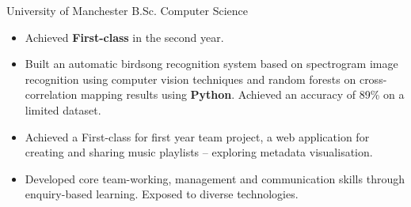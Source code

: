 \documentclass[12pt,a4paper]{article}
\begin{document}
\noindent{}



       {University of Manchester}
       {B.Sc. Computer Science}
{%
  \begin{itemize}
    \item Achieved {\bfseries First-class} in the second year.

    \item Built an automatic birdsong recognition system based on spectrogram
      image recognition using computer vision techniques and random forests on
      cross-correlation mapping results using
      {\bfseries Python}.
      Achieved an accuracy of 89\% on a limited dataset.

    \item Achieved a First-class for first year team project, a web application
      for creating and sharing music playlists -- exploring metadata visualisation.

    \item Developed core team-working, management and communication skills
      through enquiry-based learning. Exposed to diverse technologies.

  \end{itemize}
}

\end{document}
